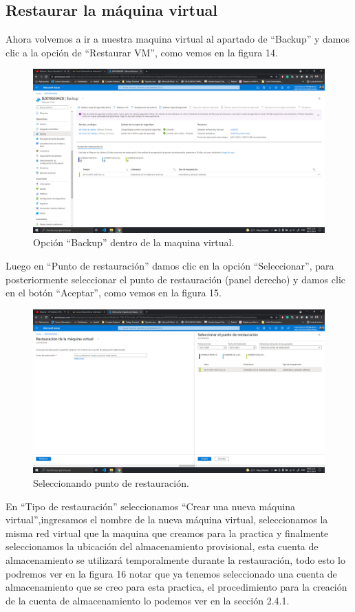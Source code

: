 \documentclass[11pt]{article}
\begin{document}
		\subsection{Restaurar la máquina virtual}
		Ahora volvemos a ir a nuestra maquina virtual al apartado de ``Backup'' y damos clic a la opción de ``Restaurar VM'', como vemos en la figura 14.
		\begin{figure}[H]
			\centering
			\includegraphics[scale=0.34]{resources/3.1-2.png}
			\caption{Opción ``Backup'' dentro de la maquina virtual.}\label{fig:picture}
		\end{figure}
		Luego en ``Punto de restauración'' damos clic en la opción ``Seleccionar'', para posteriormente seleccionar el punto de restauración (panel derecho) y damos clic en el botón ``Aceptar'', como vemos en la figura 15.
		\begin{figure}[H]
			\centering
			\includegraphics[scale=0.34]{resources/3.3-4.png}
			\caption{Seleccionando punto de restauración.}\label{fig:picture}
		\end{figure}
		 En ``Tipo de restauración'' seleccionamos ``Crear una nueva máquina virtual'',ingresamos el nombre de la nueva máquina virtual, seleccionamos la misma red virtual que la maquina que creamos para la practica y finalmente seleccionamos la ubicación del almacenamiento provisional, esta cuenta de almacenamiento se utilizará temporalmente durante la restauración, todo esto lo podremos ver en la figura 16 notar que ya tenemos seleccionado una cuenta de almacenamiento que se creo para esta practica, el procedimiento para la creación de la cuenta de almacenamiento lo podemos ver en la sección 2.4.1.
\end{document}
